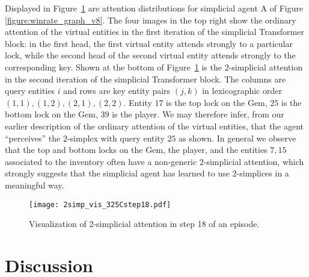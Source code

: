 \documentclass{article} %
\begin{document}
Displayed in Figure~\ref{figure:325Cstep18} are attention distributions for simplicial agent A of Figure \ref{figure:winrate_graph_v8}. The four images in the top right show the ordinary attention of the virtual entities in the first iteration of the simplicial Transformer block: in the first head, the first virtual entity attends strongly to a particular lock, while the second head of the second virtual entity attends strongly to the corresponding key.  Shown at the bottom of Figure~\ref{figure:325Cstep18} is the $2$-simplicial attention in the second iteration of the simplicial Transformer block. The columns are query entities $i$ and rows are key entity pairs $(j,k)$ in lexicographic order $(1,1),(1,2),(2,1),(2,2)$. Entity $17$ is the top lock on the Gem, $25$ is the bottom lock on the Gem, $39$ is the player. We may therefore infer, from our earlier description of the ordinary attention of the virtual entities, that the agent ``perceives'' the $2$-simplex with query entity $25$ as shown. In general we observe that the top and bottom locks on the Gem, the player, and the entities $7,15$ associated to the inventory often have a non-generic $2$-simplicial attention, which strongly suggests that the simplicial agent has learned to use $2$-simplices in a meaningful way.

\begin{figure}[h]
\begin{center}
\texttt{[image: 2simp\_vis\_325Cstep18.pdf]}
\end{center}
\caption{Visualization of 2-simplicial attention in step 18 of an episode.}
\label{figure:325Cstep18}
\end{figure}




\section{Discussion}
\label{section:discussion}
\end{document}
